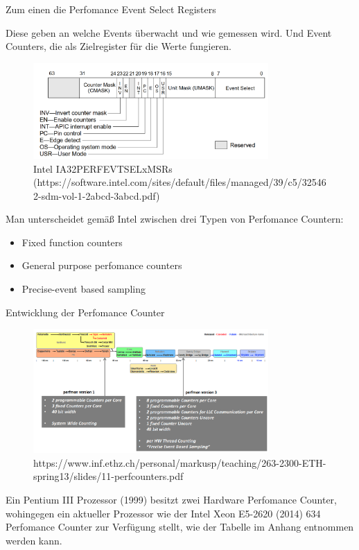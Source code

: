 Zum einen die Perfomance Event Select Registers

Diese geben an welche Events überwacht und wie gemessen wird.
Und Event Counters, die als Zielregister für die Werte fungieren.

\begin{figure}[ht]
	\centering
	\includegraphics[width=0.8\textwidth]{MSR.png}
	\caption{Intel IA32PERFEVTSELxMSRs (https://software.intel.com/sites/default/files/managed/39/c5/325462-sdm-vol-1-2abcd-3abcd.pdf)}
	\label{fig1}
\end{figure}

Man unterscheidet gemäß Intel zwischen drei Typen von Perfomance Countern:
\begin{itemize} 
	
\item Fixed function counters 
\item General purpose perfomance counters
\item Precise-event based sampling

\end{itemize}

Entwicklung der Perfomance Counter

\begin{figure}[ht]
	\centering
	\includegraphics[width=0.8\textwidth]{EvoHPC.png}
	\caption{https://www.inf.ethz.ch/personal/markusp/teaching/263-2300-ETH-spring13/slides/11-perfcounters.pdf}
	\label{fig2}
\end{figure}

Ein Pentium III Prozessor (1999) besitzt zwei Hardware Perfomance Counter, wohingegen ein
aktueller Prozessor wie der Intel Xeon E5-2620 (2014) 634 Perfomance Counter zur Verfügung
stellt, wie der Tabelle im Anhang entnommen werden kann.
\cite{Xeon}

